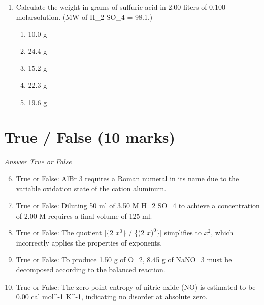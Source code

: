 \documentclass[12pt]{article}
\begin{document}
\begin{enumerate}[label=\arabic*.]
\begin{enumerate}[label=(\alph*)]
    \item Boiling point is 101.00^\ensuremath{\circC}, Freezing point is -2.00^\ensuremath{\circC}
    \item Boiling point is 99.57^\ensuremath{\circC}, Freezing point is 1.55^\ensuremath{\circC}
    \item Boiling point is 100.0^\ensuremath{\circC}, Freezing point is 0.0^\ensuremath{\circC}
    \item Boiling point is 100.43^\ensuremath{\circC}, Freezing point is 1.55^\ensuremath{\circC}
\end{enumerate}
\item Calculate the weight in grams of sulfuric acid in 2.00 liters of 0.100 molarsolution. (MW of H\_2 SO\_4 = 98.1.)
\begin{enumerate}[label=(\alph*)]
    \item 10.0 g
    \item 24.4 g
    \item 15.2 g
    \item 22.3 g
    \item 19.6 g
\end{enumerate}
\end{enumerate}

\section*{True / False (10 marks)}
\textit{Answer True or False}
\begin{enumerate}[label=\arabic*.]
\setcounter{enumi}{5}
\item True or False: AlBr 3 requires a Roman numeral in its name due to the variable oxidation state of the cation aluminum.
\item True or False: Diluting 50 ml of 3.50 M H\_2 SO\_4 to achieve a concentration of 2.00 M requires a final volume of 125 ml.
\item True or False: The quotient [\{2 $x^0$\} / \{(2 $x)^0$\}] simplifies to $x^2$, which incorrectly applies the properties of exponents.
\item True or False: To produce 1.50 g of O\_2, 8.45 g of NaNO\_3 must be decomposed according to the balanced reaction.
\item True or False: The zero-point entropy of nitric oxide (NO) is estimated to be 0.00 cal mol^-1 K^-1, indicating no disorder at absolute zero.
\end{enumerate}
\end{document}
